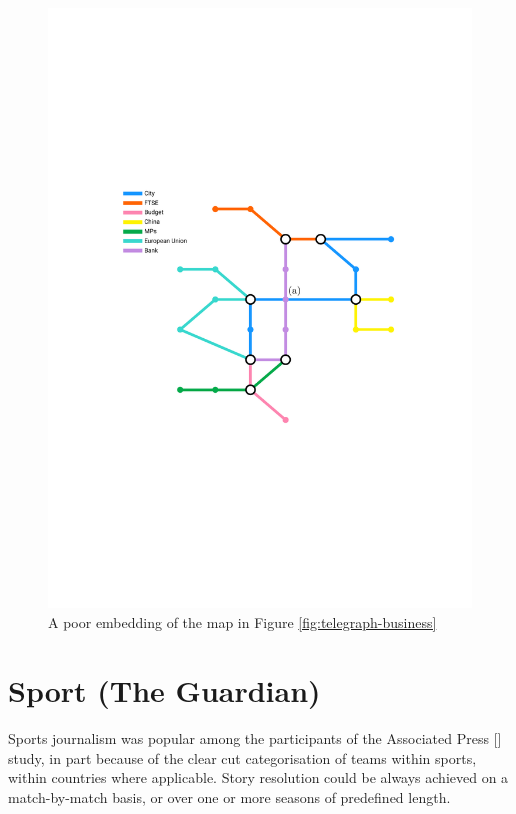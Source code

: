 \begin{figure}[htbp!]
	\centering
	\includegraphics[width=\textwidth]{img/results/telegraph-business-poor.pdf}
	\caption{A poor embedding of the map in Figure \ref{fig:telegraph-business}}
	\label{fig:telegraph-business-poor}
\end{figure}


\section{Sport (The Guardian) \label{sec:sport}}

Sports journalism was popular among the participants of the Associated Press [\citeyear{anewmodelfornews}] study, in part because of the clear cut categorisation of teams within sports, within countries where applicable. Story resolution could be always achieved on a match-by-match basis, or over one or more seasons of predefined length. 

